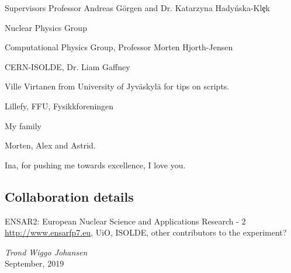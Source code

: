 \documentclass[twoside,english]{uiofysmaster/uiofysmaster}
\begin{document}
\begin{acknowledgements}
Supervisors Professor Andreas Görgen and Dr. Katarzyna Hady{\'{n}}ska-Kl{\c{e}}k

Nuclear Physics Group

Computational Physics Group, Professor Morten Hjorth-Jensen

CERN-ISOLDE, Dr. Liam Gaffney

Ville Virtanen from University of Jyväskylä for tips on scripts. 

Lillefy, FFU, Fysikkforeningen

My family

Morten, Alex and Astrid.

Ina, for pushing me towards excellence, I love you.

\subsection*{Collaboration details}


ENSAR2: European Nuclear Science and Applications Research - 2 \url{http://www.ensarfp7.eu}, UiO, ISOLDE, other contributors to the experiment?



  \vspace{1.5cm}
  
  \noindent\textit{Trond Wiggo Johansen}\\
  
  \noindent September, 2019


\vspace{1cm}


\end{acknowledgements}
\end{document}
